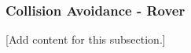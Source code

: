 
\subsubsection{Collision Avoidance - Rover}
\label{subsubsec:design_7_4_collision_avoidance_rover}

[Add content for this subsection.]
